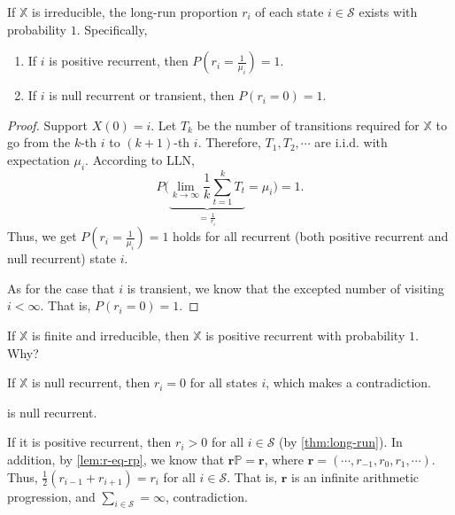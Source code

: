\begin{theorem} \label{thm:long-run}
If $ \mathbb{X} $ is irreducible, the long-run proportion $ r_{i} $ of each state $ i \in \mathcal{S} $ exists with probability $ 1 $. Specifically,
\begin{enumerate}
  \item If $ i $ is positive recurrent, then $ P \left( r_{i} = \frac{1}{\mu_{i}} \right) = 1 $.
  \item If $ i $ is null recurrent or transient, then $ P(r_{i} = 0) = 1 $.
\end{enumerate}

\begin{proof}
Support $ X(0) = i $. Let $ T_{k} $ be the number of transitions required for $ \mathbb{X} $ to go from the $ k $-th $ i $ to $ (k + 1) $-th $ i $. Therefore, $ T_{1}, T_{2}, \cdots $ are i.i.d. with expectation $ \mu_{i} $. According to LLN,
\[ P \Bigg( \underbrace{\lim_{k \to \infty} \frac{1}{k} \sum_{t = 1}^{k} T_{t}}_{= \frac{1}{r_{i}}} = \mu_{i} \Bigg) = 1. \]
Thus, we get $ P \left( r_{i} = \frac{1}{\mu_{i}} \right) = 1 $ holds for all recurrent (both positive recurrent and null recurrent) state $ i $.

As for the case that $ i $ is transient, we know that the excepted number of visiting $ i < \infty $. That is, $ P(r_{i} = 0) = 1 $.
\end{proof}
\end{theorem}

\begin{example}
If $ \mathbb{X} $ is finite and irreducible, then $ \mathbb{X} $ is positive recurrent with probability $ 1 $. Why?

If $ \mathbb{X} $ is null recurrent, then $ r_{i} = 0 $ for all states $ i $, which makes a contradiction.
\end{example}

\begin{example}
 is null recurrent.

If it is positive recurrent, then $ r_{i} > 0 $ for all $ i \in \mathcal{S} $ (by \autoref{thm:long-run}).
In addition, by \autoref{lem:r-eq-rp}, we know that $ \mathbf{r}\mathbb{P} = \mathbf{r} $, where $ \mathbf{r} = (\cdots, r_{-1}, r_{0}, r_{1}, \cdots) $. Thus, $ \frac{1}{2} (r_{i - 1} + r_{i + 1}) = r_{i} $ for all $ i \in \mathcal{S} $. That is, $ \mathbf{r} $ is an infinite arithmetic progression, and $ \sum_{i \in \mathcal{S}} = \infty $, contradiction.
\end{example}

